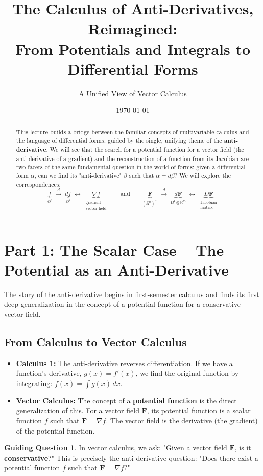 \documentclass[12pt, letterpaper]{article}
\title{\bfseries The Calculus of Anti-Derivatives, Reimagined: \\ \large From Potentials and Integrals to Differential Forms}
\author{A Unified View of Vector Calculus}
\date{\today}
\theoremstyle{definition}
\newtheorem{question}{Guiding Question}[section]
\newcommand{\R}{\mathbb{R}}
\begin{document}
	\maketitle
	
	\begin{abstract}
		This lecture builds a bridge between the familiar concepts of multivariable calculus and the language of differential forms, guided by the single, unifying theme of the \textbf{anti-derivative}. We will see that the search for a potential function for a vector field (the anti-derivative of a gradient) and the reconstruction of a function from its Jacobian are two facets of the same fundamental question in the world of forms: given a differential form $\alpha$, can we find its "anti-derivative" $\beta$ such that $\alpha = d\beta$? We will explore the correspondences:
		\[
		\underbrace{f}_{\Omega^0}
		\;\xrightarrow{d}\;
		\underbrace{df}_{\Omega^1}
		\;\longleftrightarrow\;
		\underbrace{\nabla f}_{\substack{\text{gradient}\\\text{vector field}}}
		\qquad \text{and} \qquad
		\underbrace{\mathbf F}_{(\Omega^0)^m}
		\;\xrightarrow{d}\;
		\underbrace{d\mathbf F}_{\Omega^1\otimes\R^m}
		\;\longleftrightarrow\;
		\underbrace{D\mathbf F}_{\substack{\text{Jacobian}\\\text{matrix}}}
		\]
	\end{abstract}
	
	\section{Part 1: The Scalar Case -- The Potential as an Anti-Derivative}
	
	The story of the anti-derivative begins in first-semester calculus and finds its first deep generalization in the concept of a potential function for a conservative vector field.
	
	\subsection{From Calculus to Vector Calculus}
	\begin{itemize}
		\item \textbf{Calculus 1:} The anti-derivative reverses differentiation. If we have a function's derivative, $g(x) = f'(x)$, we find the original function by integrating: $f(x) = \int g(x) \, dx$.
		\item \textbf{Vector Calculus:} The concept of a \textbf{potential function} is the direct generalization of this. For a vector field $\mathbf{F}$, its potential function is a scalar function $f$ such that $\mathbf{F} = \nabla f$. The vector field is the derivative (the gradient) of the potential function.
	\end{itemize}
%	
	\begin{question}
		In vector calculus, we ask: "Given a vector field $\mathbf{F}$, is it \textbf{conservative}?" This is precisely the anti-derivative question: "Does there exist a potential function $f$ such that $\mathbf{F} = \nabla f$?"
	\end{question}
	
\end{document}
